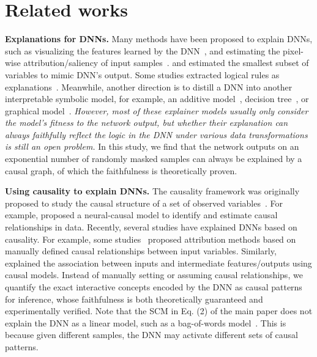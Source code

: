 \appendix
\onecolumn

\section{Related works}
\label{sec:related works}

\textbf{Explanations for DNNs.}
Many methods have been proposed to explain DNNs, such as visualizing the features learned by the DNN~\cite{simonyan2013deep,zeiler2014visualizing,yosinski2015understanding,dosovitskiy2016inverting}, and estimating the pixel-wise attribution/saliency of input samples~\cite{Adamczewski2010bayesian,ribeiro2016should,lundberg2017unified,fong2017interpretable,zhou2014object,zhou2016learning,selvaraju2017grad}.
\cite{chen2018L2X} and \cite{yoon2019invase} estimated the smallest subset of variables to mimic DNN’s output.
Some studies extracted logical rules as explanations~\cite{ignatiev2019abduction,ignatiev2019relating,pmlr-v139-marques-silva21a,barbiero2022entropy,wang2021scalable}.
Meanwhile, another direction is to distill a DNN into another interpretable symbolic model, for example, an additive model~\cite{vaughan2018explainable,tan2018learning}, decision tree~\cite{frosst2017distilling,che2016interpretable,wu2018beyond,abroshan2023symbolic}, or graphical model~\cite{zhang2018interpreting,shih2019compiling}.
\textit{However, most of these explainer models usually only consider the model's fitness to the network output, but whether their explanation can always faithfully reflect the logic in the DNN under various data transformations is still an open problem.}
In this study, we find that the network outputs on an exponential number of randomly masked samples can always be explained by a causal graph, of which the faithfulness is theoretically proven.

\textbf{Using causality to explain DNNs.}
The causality framework was originally proposed to study the causal structure of a set of observed variables~\cite{pearl2009causality,hoyer2008nonlinear}.
For example, \cite{xia2021causal} proposed a neural-causal model to identify and estimate causal relationships in data.
Recently, several studies have explained DNNs based on causality.
For example, some studies~\cite{frye2020asymmetric,heskes2020causal,wang2021shapley} proposed attribution methods based on manually defined causal relationships between input variables.
Similarly, \cite{alvarez2017causal,harradon2018causal,chattopadhyay2019neural} explained the association between inputs and intermediate features/outputs using causal models.
Instead of manually setting or assuming causal relationships, we quantify the exact interactive concepts encoded by the DNN as causal patterns for inference, whose faithfulness is both theoretically guaranteed and experimentally verified.
Note that the SCM in Eq. (2) of the main paper does not explain the DNN as a linear model, such as a bag-of-words model~\cite{sivic2003video,csurka2004visual}.
This is because given different samples, the DNN may activate different sets of causal patterns.



